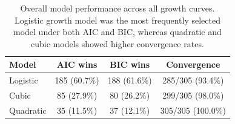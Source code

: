 \begin{table}[H]
\centering
\caption{Overall model performance across all growth curves. Logistic growth model was the most frequently selected model under both AIC and BIC, whereas quadratic and cubic models showed higher convergence rates.}
\label{tab:model_summary}
\begin{tabular}{lccc}
\toprule
Model & AIC wins & BIC wins & Convergence \\
\midrule
Logistic  & 185 (60.7\%) & 188 (61.6\%) & 285/305 (93.4\%) \\
Cubic     & 85 (27.9\%)  & 80 (26.2\%)  & 299/305 (98.0\%) \\
Quadratic & 35 (11.5\%)  & 37 (12.1\%)  & 305/305 (100.0\%) \\
\bottomrule
\end{tabular}
\end{table}